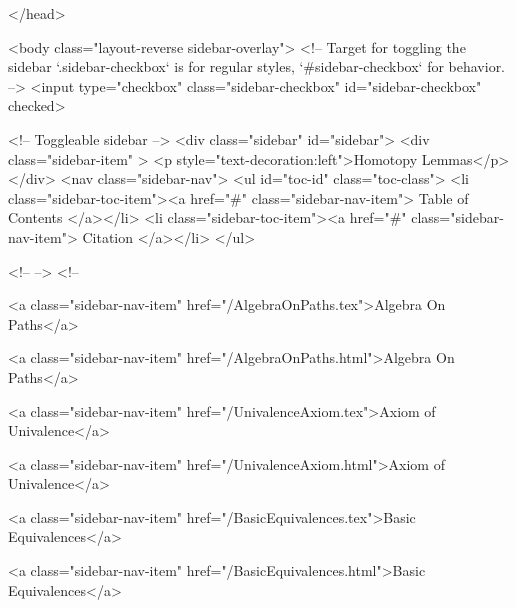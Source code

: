   
</head>




  <body class="layout-reverse sidebar-overlay">
    <!-- Target for toggling the sidebar `.sidebar-checkbox` is for regular
     styles, `#sidebar-checkbox` for behavior. -->
<input type="checkbox" class="sidebar-checkbox" id="sidebar-checkbox" checked>

<!-- Toggleable sidebar -->
<div class="sidebar" id="sidebar">
  <div class="sidebar-item" >
    <p style="text-decoration:left">Homotopy Lemmas</p>
  </div>
  <nav class="sidebar-nav">
    <ul id="toc-id" class="toc-class">
  <li class="sidebar-toc-item"><a href="#" class="sidebar-nav-item"> Table of Contents </a></li>
  <li class="sidebar-toc-item"><a href="#" class="sidebar-nav-item"> Citation </a></li>
</ul>


    <!--  -->
    <!-- 
      
    
      
    
      
    
      
    
      
        
      
    
      
        
          <a class="sidebar-nav-item" href="/AlgebraOnPaths.tex">Algebra On Paths</a>
        
      
    
      
        
          <a class="sidebar-nav-item" href="/AlgebraOnPaths.html">Algebra On Paths</a>
        
      
    
      
        
          <a class="sidebar-nav-item" href="/UnivalenceAxiom.tex">Axiom of Univalence</a>
        
      
    
      
        
          <a class="sidebar-nav-item" href="/UnivalenceAxiom.html">Axiom of Univalence</a>
        
      
    
      
        
          <a class="sidebar-nav-item" href="/BasicEquivalences.tex">Basic Equivalences</a>
        
      
    
      
        
          <a class="sidebar-nav-item" href="/BasicEquivalences.html">Basic Equivalences</a>
        
